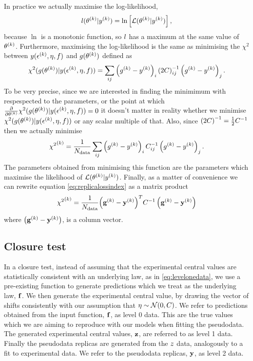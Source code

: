 In practice we actually maximise the log-likelihood,
\begin{equation}
    l(\theta^{(k)} \vert y^{(k)}) = \ln \left[
        \mathcal{L}(\theta^{(k)} \vert y^{(k)}) \right],
\end{equation}
because $\ln$ is a monotonic function, so $l$ has a maximum at the same value
of $\theta^{(k)}$. Furthermore, maximising the log-likelihood is the same
as minimising the $\chi^2$ between $y(\epsilon^{(k)}, \eta, f)$
and $g(\theta^{(k)})$ defined as
\begin{equation}
    \chi^2(g(\theta^{(k)}) \vert y(\epsilon^{(k)}, \eta, f))
    = \sum_{ij} \left( g^{(k)} - y^{(k)} \right)_i {(2C)}^{-1}_{ij} \left( g^{(k)} - y^{(k)} \right)_j.
\end{equation}
To be very precise, since
we are interested in finding the minimimum with respespected to the parameters,
or the point at which
$\frac{\partial}{\partial \theta^{(k)}}
\chi^2(g(\theta^{(k)})\vert y(\epsilon^{(k)}, \eta, f)) = 0$
it doesn't matter in reality whether we minimise
$\chi^2(g(\theta^{(k)})\vert y(\epsilon^{(k)}, \eta, f))$ or
any scalar multiple of that. Also, since ${(2C)}^{-1} = \frac{1}{2}C^{-1}_{}$
then we actually minimise
\begin{equation}\label{eq:replicalossindex}
    {\chi^2}^{(k)} = \frac{1}{N_{\rm data}} \sum_{ij} \left( g^{(k)} - y^{(k)} \right)_i C^{-1}_{ij} \left( g^{(k)} - y^{(k)} \right)_j.
\end{equation}
The parameters obtained from minimising this function are the parameters which
maximise the likelihood of
$\mathcal{L}(\theta^{(k)} \vert y^{(k)})$. Finally, as a matter
of convenience we can rewrite equation \eqref{eq:replicalossindex} as a matrix
product
\begin{equation}\label{eq:replicaloss}
    {\chi^2}^{(k)} = \frac{1}{N_{\rm data}} {\left( \mathbf{g}^{(k)} - \mathbf{y}^{(k)} \right)}^{T} C^{-1}_{} \left( \mathbf{g}^{(k)} - \mathbf{y}^{(k)} \right)
\end{equation}
where $\left( \mathbf{g}^{(k)} - \mathbf{y}^{(k)} \right)$, is a column vector.

\subsection{Closure test}

In a closure test, instead of assuming that the experimental central values are
statistically consistent with an underlying law, as in \eqref{eq:levelonedata},
we use a pre-existing function to generate predictions which we treat as the
underlying law, $\mathbf{f}$. We then generate the experimental
central value, by drawing the vector of shifts consistently with our assumption
that $\mathbf{\eta} \sim \mathcal{N}(0, C)$. We refer to predictions obtained
from the input function, $\mathbf{f}$, as level 0 data. This are the true values
which we are aiming to reproduce with our models when fitting the pseudodata.
The generated
experimental central values, $\mathbf{z}$, are referred to as level 1 data.
Finally the pseudodata replicas are generated from the $z$ data,
analogously to a fit to experimental data. We refer to the pseudodata replicas,
$\mathbf{y}$, as level 2 data.

